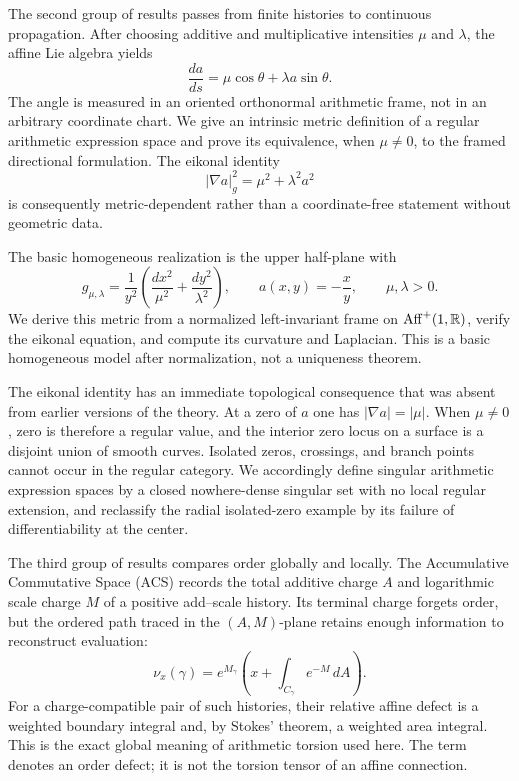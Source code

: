 The second group of results passes from finite histories to continuous propagation.
After choosing additive and multiplicative intensities $\mu$ and $\lambda$, the
affine Lie algebra yields
\begin{equation}\label{eq:intro-flow}
 \frac{da}{ds}=\mu\cos\theta+\lambda a\sin\theta.
\end{equation}
The angle is measured in an oriented orthonormal arithmetic frame, not in an
arbitrary coordinate chart.  We give an intrinsic metric definition of a regular
arithmetic expression space and prove its equivalence, when $\mu\ne0$, to the framed
directional formulation.  The eikonal identity
\[
 |\nabla a|_g^2=\mu^2+\lambda^2a^2
\]
is consequently metric-dependent rather than a coordinate-free statement without
geometric data.

The basic homogeneous realization is the upper half-plane with
\[
 g_{\mu,\lambda}
 =\frac{1}{y^2}
   \left(\frac{dx^2}{\mu^2}+\frac{dy^2}{\lambda^2}\right),
 \qquad
 a(x,y)=-\frac{x}{y},
 \qquad \mu,\lambda>0.
\]
We derive this metric from a normalized left-invariant frame on
$\operatorname{Aff}^+(1,\mathbb{R})$, verify the eikonal equation, and compute its curvature and
Laplacian.  This is a basic homogeneous model after normalization, not a uniqueness
theorem.

The eikonal identity has an immediate topological consequence that was absent from
earlier versions of the theory.  At a zero of $a$ one has
$|\nabla a|=|\mu|$.  When $\mu\ne0$, zero is therefore a regular value, and the
interior zero locus on a surface is a disjoint union of smooth curves.  Isolated
zeros, crossings, and branch points cannot occur in the regular category.  We
accordingly define singular arithmetic expression spaces by a closed nowhere-dense
singular set with no local regular extension, and reclassify the radial isolated-zero
example by its failure of differentiability at the center.

The third group of results compares order globally and locally.  The Accumulative
Commutative Space (ACS) records the total additive charge $A$ and logarithmic scale
charge $M$ of a positive add--scale history.  Its terminal charge forgets order, but
the ordered path traced in the $(A,M)$-plane retains enough information to reconstruct
evaluation:
\[
 \nu_x(\gamma)
 =e^{M_\gamma}
   \left(x+\int_{C_\gamma}e^{-M}\,dA\right).
\]
For a charge-compatible pair of such histories, their relative affine defect is a
weighted boundary integral and, by Stokes' theorem, a weighted area integral.  This
is the exact global meaning of arithmetic torsion used here.  The term denotes an
order defect; it is not the torsion tensor of an affine connection.

